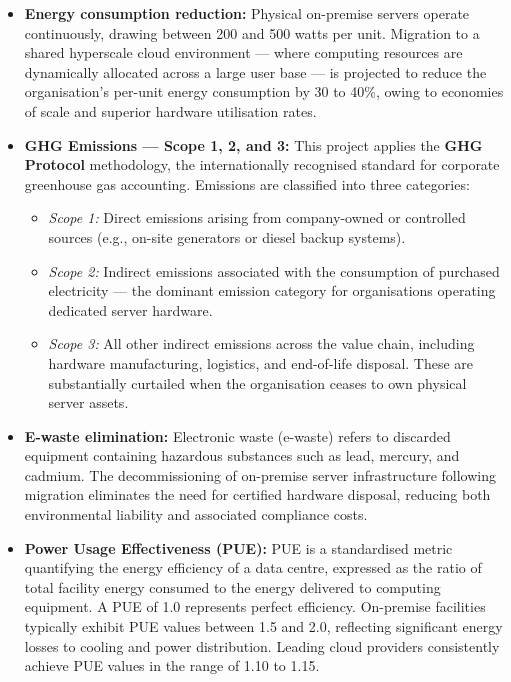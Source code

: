 \begin{itemize}[leftmargin=*, label=\textcolor{midgreen}{$\bullet$}]

  \item \textbf{Energy consumption reduction:} Physical on-premise servers
    operate continuously, drawing between 200 and 500 watts per unit.
    Migration to a shared hyperscale cloud environment --- where computing
    resources are dynamically allocated across a large user base --- is
    projected to reduce the organisation's per-unit energy consumption by
    30 to 40\%, owing to economies of scale and superior hardware
    utilisation rates.

  \item \textbf{GHG Emissions --- Scope 1, 2, and 3:} This project applies
    the \textbf{GHG Protocol} methodology, the internationally recognised
    standard for corporate greenhouse gas accounting. Emissions are
    classified into three categories:
    \begin{itemize}[label=\textcolor{lightgreen}{--}]
      \item \textit{Scope 1:} Direct emissions arising from company-owned
        or controlled sources (e.g., on-site generators or diesel backup
        systems).
      \item \textit{Scope 2:} Indirect emissions associated with the
        consumption of purchased electricity --- the dominant emission
        category for organisations operating dedicated server hardware.
      \item \textit{Scope 3:} All other indirect emissions across the
        value chain, including hardware manufacturing, logistics, and
        end-of-life disposal. These are substantially curtailed when the
        organisation ceases to own physical server assets.
    \end{itemize}

  \item \textbf{E-waste elimination:} Electronic waste (e-waste) refers to
    discarded equipment containing hazardous substances such as lead,
    mercury, and cadmium. The decommissioning of on-premise server
    infrastructure following migration eliminates the need for certified
    hardware disposal, reducing both environmental liability and associated
    compliance costs.

  \item \textbf{Power Usage Effectiveness (PUE):} PUE is a standardised
    metric quantifying the energy efficiency of a data centre, expressed as
    the ratio of total facility energy consumed to the energy delivered to
    computing equipment. A PUE of 1.0 represents perfect efficiency.
    On-premise facilities typically exhibit PUE values between 1.5 and
    2.0, reflecting significant energy losses to cooling and power
    distribution. Leading cloud providers consistently achieve PUE values
    in the range of 1.10 to 1.15.


\end{itemize}
